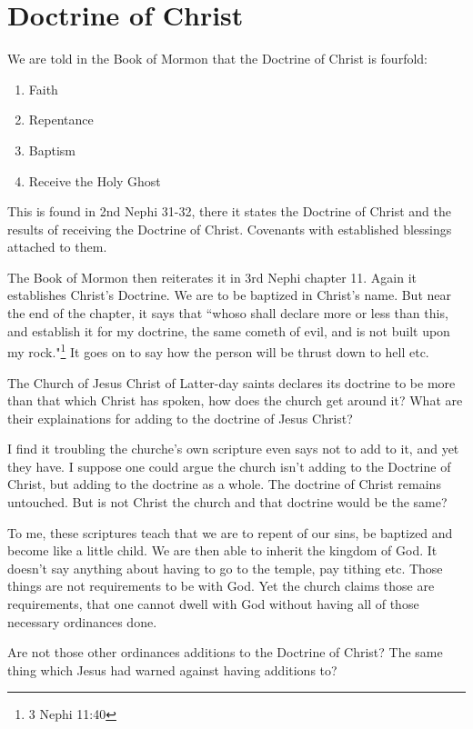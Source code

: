 \section{Doctrine of Christ}

We are told in the Book of Mormon that the Doctrine of Christ is fourfold:

\begin{enumerate}
  \item Faith
  \item Repentance
  \item Baptism
  \item Receive the Holy Ghost
\end{enumerate}

This is found in 2nd Nephi 31-32, there it states the Doctrine of Christ and the
results of receiving the Doctrine of Christ. Covenants with established blessings
attached to them.

The Book of Mormon then reiterates it in 3rd Nephi chapter 11. Again it establishes
Christ's Doctrine. We are to be baptized in Christ's name. But near the end of the
chapter, it says that ``whoso shall declare more or less than this, and establish it
for my doctrine, the same cometh of evil, and is not built upon my rock."\footnote{
3 Nephi 11:40
} It goes on to say how the person will be thrust down to hell etc.

The Church of Jesus Christ of Latter-day saints declares its doctrine to be more than
that which Christ has spoken, how does the church get around it? What are their
explainations for adding to the doctrine of Jesus Christ?

I find it troubling the churche's own scripture even says not to add to it, and yet
they have. I suppose one could argue the church isn't adding to the Doctrine of
Christ, but adding to the doctrine as a whole. The doctrine of Christ remains
untouched. But is not Christ the church and that doctrine would be the same?

To me, these scriptures teach that we are to repent of our sins, be baptized and
become like a little child. We are then able to inherit the kingdom of God. It
doesn't say anything about having to go to the temple, pay tithing etc. Those things
are not requirements to be with God. Yet the church claims those are requirements,
that one cannot dwell with God without having all of those necessary ordinances done.

Are not those other ordinances additions to the Doctrine of Christ? The same thing
which Jesus had warned against having additions to?

